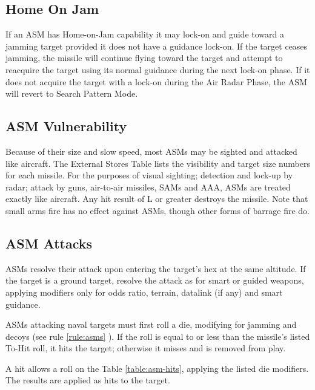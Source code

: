 \begin{advancedrules}
    \subsection{Home On Jam} If an ASM has Home-on-Jam capability it may lock-on and guide toward a jamming target provided it does not have a guidance lock-on. If the target ceases jamming, the missile will continue flying toward the target and attempt to reacquire the target using its normal guidance during the next lock-on phase.  If it does not acquire the target with a lock-on during the Air Radar Phase, the ASM will revert to Search Pattern Mode.

    \subsection{ASM Vulnerability}  Because of their size and slow speed, most ASMs may be sighted and attacked like aircraft.  The External Stores Table lists the visibility and target size numbers for each missile.  For the purposes of visual sighting; detection and lock-up by radar; attack by guns, air-to-air missiles, SAMs and AAA, ASMs are treated exactly like aircraft.  Any hit result of L or greater destroys the missile.  Note that small arms fire has no effect against ASMs, though other forms of barrage fire do.

    \subsection{ASM Attacks} ASMs resolve their attack upon entering the target's hex at the same altitude.  If the target is a ground target, resolve the attack as for smart or guided weapons, applying modifiers only for odds ratio, terrain, datalink (if any) and smart guidance.

    ASMs attacking naval targets must first roll a die, modifying for jamming and decoys (see rule \ref{rule:asms}
    ).  If the roll is equal to or less than the missile's listed To-Hit roll, it hits the target; otherwise it misses and is removed from play.

    A hit allows a roll on the Table \ref{table:asm-hits}, applying the listed die modifiers.  The results are applied as hits to the target.

    

\end{advancedrules}

